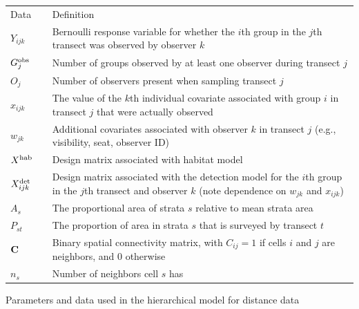 \documentclass[10pt]{article}
\begin{document}
\begin{table}
\begin{tabular}{p{1.5cm}l p{12.5cm}}
Data & & Definition \\
\cline{1-1} \cline{3-3}
$Y_{ijk}$ &  & Bernoulli response variable for whether the $i$th group in the $j$th transect
                was observed by observer $k$\\
$G_j^{\rm obs}$ & & Number of groups observed by at least one observer during transect $j$\\
$O_j$   & & Number of observers present when sampling transect $j$ \\
$x_{ijk}$   & &  The value of the $k$th individual covariate associated with group
                $i$ in transect $j$ that were actually observed\\
$w_{jk}$ & & Additional covariates associated with observer $k$ in transect $j$ (e.g.,
            visibility, seat, observer ID)\\
$X^{\rm hab}$   & &  Design matrix associated with habitat model\\
$X^{\rm det}_{ijk}$   & &  Design matrix associated with the detection model for the $i$th group in the $j$th transect
                and observer $k$ (note dependence on
                $w_{jk}$ and $x_{ijk}$) \\
$A_s$   & & The proportional area of strata $s$ relative to mean strata area\\
$P_{st}$   & & The proportion of area in strata $s$ that is surveyed by transect $t$\\
${\bf C}$ & & Binary spatial connectivity matrix, with $C_{ij}=1$ if cells $i$ and $j$ are neighbors, and 0 otherwise\\
$n_s$   & & Number of neighbors cell $s$ has\\
\hline
\end{tabular}
\begin{flushleft}Parameters and data used in the hierarchical model for distance data
\end{flushleft}
\label{tab:defs}
\end{table}

\end{document}
